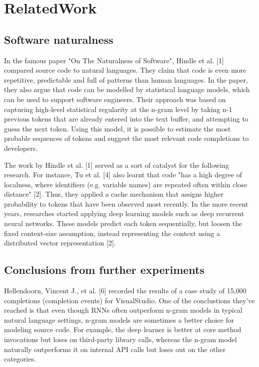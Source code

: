 \chapter{RelatedWork}
\label{chap:RelatedWork}

\section{Software naturalness}
In the famous paper "On The Naturalness of Software", Hindle et al. [1] compared source code
to natural languages. They claim that code is even more repetitive, predictable and full of
patterns than human languages. In the paper, they also argue that code can be modelled by
statistical language models, which can be used to support software engineers. Their approach
was based on capturing high-level statistical regularity at the n-gram level by taking n-1
previous tokens that are already entered into the text buffer, and attempting to guess the
next token. Using this model, it is possible to estimate the most probable sequences of tokens
and suggest the most relevant code completions to developers.

The work by Hindle et al. [1] served as a sort of catalyst for the following research. For
instance, Tu et al. [4] also learnt that code "has a high degree of localness, where identifiers
(e.g. variable names) are repeated often within close distance" [2]. Thus, they applied a cache
mechanism that assigns higher probability to tokens that have been observed most recently. In the
more recent years, researches started applying deep learning models such as deep recurrent
neural networks. These models predict each token sequentially, but loosen the fixed context-size
assumption, instead representing the context using a distributed vector representation [2].

\section{Conclusions from further experiments}
Hellendoorn, Vincent J., et al. [6] recorded the results of a case study of 15,000 completions
(completion events) for VisualStudio. One of the conclustions they've reached is that even though
RNNs often outperform n-gram models in typical natural language settings, n-gram models are
sometimes a better choice for modeling source code. For example, the deep learner is better at
core method invocations but loses on third-party library calls, whereas the n-gram model
naturally outperforms it on internal API calls but loses out on the other categories.

